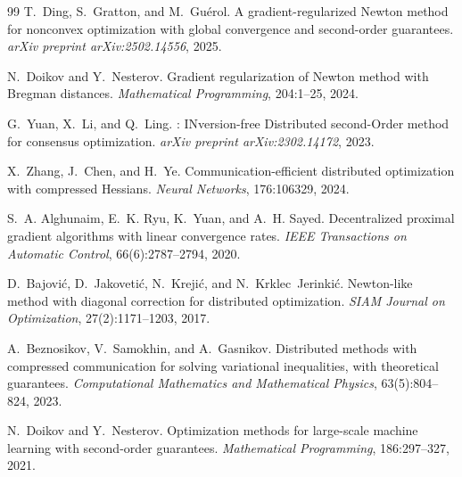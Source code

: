 \documentclass[review,onefignum,onetabnum]{siamart171218}
\begin{document}
\begin{thebibliography}{99}
		T.~Ding, S.~Gratton, and M.~Gu\'erol.
		\newblock A gradient-regularized {N}ewton method for nonconvex optimization with global convergence and second-order guarantees.
		\newblock \emph{arXiv preprint arXiv:2502.14556}, 2025.
		
		N.~Doikov and Y.~Nesterov.
		\newblock Gradient regularization of {N}ewton method with {B}regman distances.
		\newblock \emph{Mathematical Programming}, 204:1--25, 2024.
		
		G.~Yuan, X.~Li, and Q.~Ling.
		: {IN}version-free {D}istributed second-{O}rder method for consensus optimization.
		\newblock \emph{arXiv preprint arXiv:2302.14172}, 2023.
		
		X.~Zhang, J.~Chen, and H.~Ye.
		\newblock Communication-efficient distributed optimization with compressed {H}essians.
		\newblock \emph{Neural Networks}, 176:106329, 2024.
		
		S.~A. Alghunaim, E.~K. Ryu, K.~Yuan, and A.~H. Sayed.
		\newblock Decentralized proximal gradient algorithms with linear convergence rates.
		\newblock \emph{IEEE Transactions on Automatic Control}, 66(6):2787--2794, 2020.
		
		D.~Bajovi{\'c}, D.~Jakoveti{\'c}, N.~Kre\-ji{\'c}, and N.~Krklec~Jerinki{\'c}.
		\newblock Newton-like method with diagonal correction for distributed optimization.
		\newblock \emph{SIAM Journal on Optimization}, 27(2):1171--1203, 2017.
		
		A.~Beznosikov, V.~Samokhin, and A.~Gasnikov.
		\newblock Distributed methods with compressed communication for solving variational inequalities, with theoretical guarantees.
		\newblock \emph{Computational Mathematics and Mathematical Physics}, 63(5):804--824, 2023.
		
		N.~Doikov and Y.~Nesterov.
		\newblock Optimization methods for large-scale machine learning with second-order guarantees.
		\newblock \emph{Mathematical Programming}, 186:297--327, 2021.
		

\end{thebibliography}
\end{document}
